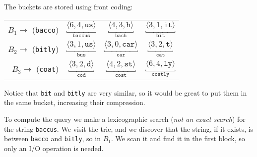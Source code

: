 %
The buckets are stored using front coding:
%
\begin{center}
\begin{tabular}{rccc}
  $B_1 \rightarrow$ (\texttt{bacco}) &
  $\underbracket{\langle 6, 4, \texttt{us} \rangle}_{\texttt{baccus}}$ &
  $\underbracket{\langle 4, 3, \texttt{h} \rangle}_{\texttt{bach}}$ &
  $\underbracket{\langle 3, 1, \texttt{it} \rangle}_{\texttt{bit}}$ \\
  $B_2 \rightarrow$ (\texttt{bitly}) &
  $\underbracket{\langle 3, 1, \texttt{us} \rangle}_{\texttt{bus}}$ &
  $\underbracket{\langle 3, 0, \texttt{car} \rangle}_{\texttt{car}}$ &
  $\underbracket{\langle 3, 2, \texttt{t} \rangle}_{\texttt{cat}}$ \\
  $B_3 \rightarrow$ (\texttt{coat}) &
  $\underbracket{\langle 3, 2, \texttt{d} \rangle}_{\texttt{cod}}$ &
  $\underbracket{\langle 4, 2, \texttt{st} \rangle}_{\texttt{cost}}$ &
  $\underbracket{\langle 6, 4, \texttt{ly} \rangle}_{\texttt{costly}}$ \\
\end{tabular}
\end{center}
%
Notice that \texttt{bit} and \texttt{bitly} are very similar, so it would be
great to put them in the same bucket, increasing their compression.

To compute the query we make a lexicographic search (\emph{not an exact search})
for the string \texttt{baccus}. We visit the trie, and we discover that the
string, if it exists, is between \texttt{bacco} and \texttt{bitly}, so in $B_1$.
We scan it and find it in the first block, so only an I/O operation is needed.
